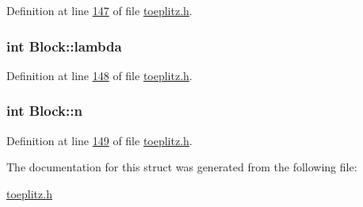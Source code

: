 Definition at line \hyperlink{toeplitz_8h_source_l00147}{147} of file \hyperlink{toeplitz_8h_source}{toeplitz.\-h}.

\hypertarget{structBlock_a8f25504e415ca086e0bcaf30b676f29f}{
\subsubsection[{lambda}]{\setlength{\rightskip}{0pt plus 5cm}int Block\-::lambda}}\label{structBlock_a8f25504e415ca086e0bcaf30b676f29f}


Definition at line \hyperlink{toeplitz_8h_source_l00148}{148} of file \hyperlink{toeplitz_8h_source}{toeplitz.\-h}.

\hypertarget{structBlock_a458266f4280fecec415e23faf8a043a8}{
\subsubsection[{n}]{\setlength{\rightskip}{0pt plus 5cm}int Block\-::n}}\label{structBlock_a458266f4280fecec415e23faf8a043a8}


Definition at line \hyperlink{toeplitz_8h_source_l00149}{149} of file \hyperlink{toeplitz_8h_source}{toeplitz.\-h}.



The documentation for this struct was generated from the following file\-:\begin{DoxyCompactItemize}
\item 
\hyperlink{toeplitz_8h}{toeplitz.\-h}\end{DoxyCompactItemize}
